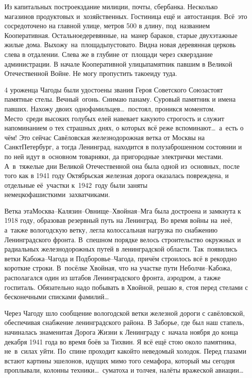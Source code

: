 Из капитальных построек\mdash здание милиции, почты, сбербанка. Несколько магазинов продуктовых и~хозяйственных. Гостиница ещё и~автостанция. Всё~это сосредоточено на главной улице, метров 500 в длину, под~названием Кооперативная. Остальное\mdash деревянные, на~манер бараков, старые двухэтажные жилые дома. Выхожу~на~площадь\mdash пустовато. Видна новая деревянная церковь слева в отдалении. Слева же в глубине от~площади через сквер\mdash здание администрации. В начале Кооперативной улицы\mdash памятник павшим в Великой Отечественной Войне. Не могу пропустить такое\mdash иду туда. 

4 уроженца Чагоды были удостоены звания Героя Советского Союза\mdash стоят памятные стелы. Вечный~огонь. Снимаю панаму. Суровый памятник и имена павших. Нахожу двоих однофамильцев\ldots~постоял, проникся моментом. Место~среди высоких голубых елей навевает какую\sdash то строгость и служит напоминанием о тех страшных днях, о которых всё реже вспоминают\ldots~а~есть о чём! Это сейчас Савёловская железнодорожная ветка от Москвы на Санкт\sdash Петербург, а тогда Ленинград, находится в полузаброшенном состоянии и по ней идут в~основном товарняки, да пригородные электрички местами. А~в~тяжелые дни Великой Отечественной она была одной из~основных, после того как в 1941 году Октябрьская железная дорога оказалась повреждена, и отдельные её~участки к~1942~году были заняты немецко\sdash фашисткими~захватчиками.

Ветка эта\mdash Москва\nobreakdash--Калязин\nobreakdash--Овнище\nobreakdash--Хвойная\nobreakdash--Мга была достроена и замкнута к 1918 году, образовав резервный путь на Ленинград. Во время войны на~неё, а~также вологодскую ветку, легла колоссальная нагрузка по снабжению Ленинградского фронта. В~спешном порядке велось строительство окружных и радиальных железнодорожных путей в ленинградской области. Так~появились ветки Кабожа\nobreakdash--Чагода и Подборовье\nobreakdash--Чагода, причём строилось всё в рекордно короткие строки. В~посёлке Хвойная, что на участке пути Неболчи\nobreakdash--Кабожа, располагался один из штабов Ленинградского фронта, аэродром, а также госпиталь. Обязательно надо побывать в Хвойной, решаю я, стоя перед стелами с бесконечными списками фамилий…

Через Чагоду шло сообщение вологодской ветки железной дороги с савёловской, обеспечивая снабжение ленинградского района. В Заборье, где был наш стапель, начиналась знаменитая Дорога Жизни к Ленинграду с~начала ноября до конца декабря 1941 года во время боёв за Тихвин. Я всё ещё стою около памятника, не~в~силах уйти. По~спине проходит какой\sdash то неведомый холодок. Перед глазами встают картины эшелонов, идущих мимо того семафора, который мы сегодня проплывали, колонны техники\ldots~суматоха и толчея, налёты вражеской авиации\ldots~  

